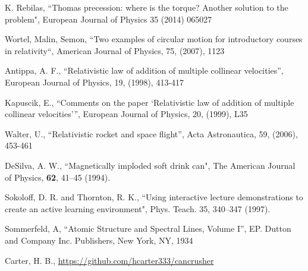 \documentclass[prb,preprint]{revtex4-1}
\begin{document}
\begin{thebibliography}{99}

 K. Rebilas, ``Thomas precession: where is the torque? Another solution to the problem", European Journal of Physics 35 (2014) 065027

  Wortel, Malin, Semon, “Two examples of circular motion for introductory courses in relativity“, 
American Journal of Physics, 75, (2007), 1123

 Antippa, A. F., “Relativistic law of addition of multiple collinear velocities”, European Journal of 
Physics, 19, (1998), 413-417

 Kapuscik, E., “Comments on the paper `Relativistic law of addition of multiple collinear velocities'”,
European Journal of Physics, 20, (1999), L35

 Walter, U., “Relativistic rocket and space flight”, Acta Astronautica, 59, (2006), 453-461

 DeSilva, A. W., ``Magnetically imploded soft drink can", The American Journal of Physics, \textbf{62}, 41--45 (1994).  

 Sokoloff, D. R. and Thornton, R. K., ``Using interactive lecture demonstrations to create an active learning environment", Phys. Teach. 35, 340--347 (1997).  

 Sommerfeld, A, “Atomic Structure and Spectral Lines, Volume I”, EP. Dutton and Company Inc. Publishers, New York, NY, 1934

 Carter, H. B., \url{https://github.com/hcarter333/cancrusher}


\end{thebibliography}

\end{document}
